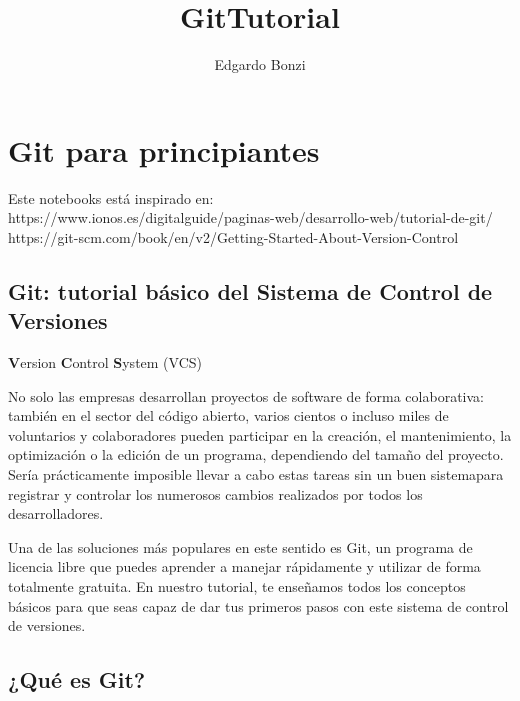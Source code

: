 \documentclass[11pt]{article}
\title{GitTutorial}
\author{Edgardo Bonzi}
\begin{document}
    
    \maketitle
    
    

    
    \hypertarget{git-para-principiantes}{%
\section{Git para principiantes}\label{git-para-principiantes}}

    Este notebooks está inspirado en:\\
https://www.ionos.es/digitalguide/paginas-web/desarrollo-web/tutorial-de-git/\\
https://git-scm.com/book/en/v2/Getting-Started-About-Version-Control

    \hypertarget{git-tutorial-buxe1sico-del-sistema-de-control-de-versiones}{%
\subsection{\texorpdfstring{Git: tutorial básico del \textbf{S}istema de
\textbf{C}ontrol de
\textbf{V}ersiones}{Git: tutorial básico del Sistema de Control de Versiones}}\label{git-tutorial-buxe1sico-del-sistema-de-control-de-versiones}}

\textbf{V}ersion \textbf{C}ontrol \textbf{S}ystem (VCS)

    No solo las empresas desarrollan proyectos de software de forma
colaborativa: también en el sector del código abierto, varios cientos o
incluso miles de voluntarios y colaboradores pueden participar en la
creación, el mantenimiento, la optimización o la edición de un programa,
dependiendo del tamaño del proyecto. Sería prácticamente imposible
llevar a cabo estas tareas sin un buen sistemapara registrar y controlar
los numerosos cambios realizados por todos los desarrolladores.

Una de las soluciones más populares en este sentido es Git, un programa
de licencia libre que puedes aprender a manejar rápidamente y utilizar
de forma totalmente gratuita. En nuestro tutorial, te enseñamos todos
los conceptos básicos para que seas capaz de dar tus primeros pasos con
este sistema de control de versiones.

    \hypertarget{quuxe9-es-git}{%
\subsection{¿Qué es Git?}\label{quuxe9-es-git}}
\end{document}
